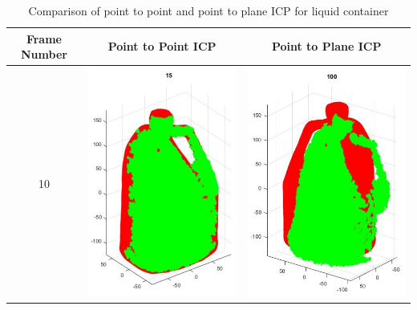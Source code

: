 \documentclass[letterpaper, 10 pt, conference]{ieeeconf}  %
\begin{document}
\begin{table}
\centering
\caption{Comparison of point to point and point to plane ICP for liquid container}
\label{tab:liquid}
\begin{tabular}{ccccccc}
Frame Number & \multicolumn{3}{c}{Point to Point ICP} & \multicolumn{3}{c}{Point to Plane ICP} \\ 
\toprule
10 & \multicolumn{3}{c}{\includegraphics[scale=0.43]{l10p.jpg}} & \multicolumn{3}{c}{\includegraphics[scale=0.43]{l10o.jpg}}\\ 

\end{tabular}
\end{table}
\end{document}
